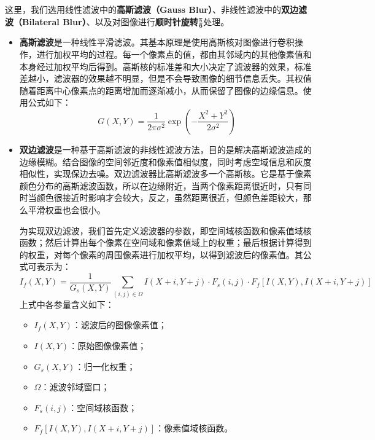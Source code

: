 \documentclass{MathorCupmodeling}
\begin{document}
	这里，我们选用线性滤波中的\textbf{高斯滤波（Gauss Blur）}、非线性滤波中的\textbf{双边滤波（Bilateral Blur）}、以及对图像进行\textbf{顺时针旋转$\boldsymbol{\frac{\pi}{6}}$}处理。
	\begin{itemize}
		\item \textbf{高斯滤波}是一种线性平滑滤波。其基本原理是使用高斯核对图像进行卷积操作，进行加权平均的过程。每一个像素点的值，都由其邻域内的其他像素值和本身经过加权平均后得到。高斯核的标准差和大小决定了滤波器的效果，标准差越小，滤波器的效果越不明显，但是不会导致图像的细节信息丢失。其权值随着距离中心像素点的距离增加而逐渐减小，从而保留了图像的边缘信息。使用公式如下：
		\begin{equation}
			G\left(X,Y\right)=\frac{1}{2\pi\sigma^2}\exp\left(-\frac{X^2+Y^2}{2\sigma^2}\right)
		\end{equation}
		\item \textbf{双边滤波}是一种基于高斯滤波的非线性滤波方法，目的是解决高斯滤波造成的边缘模糊。结合图像的空间邻近度和像素值相似度，同时考虑空域信息和灰度相似性，实现保边去噪。双边滤波器比高斯滤波多一个高斯核。它是基于像素颜色分布的高斯滤波函数，所以在边缘附近，当两个像素距离很近时，只有同时当颜色很接近时影响才会较大，反之，虽然距离很近，但颜色差距较大，那么平滑权重也会很小。
		
		为实现双边滤波，我们首先定义滤波器的参数，即空间域核函数和像素值域核函数；然后计算出每个像素在空间域和像素值域上的权重；最后根据计算得到的权重，对每个像素的周围像素进行加权平均，以得到滤波后的像素值。其公式可表示为：
		\begin{equation}
			I_f\left( X,Y \right) =\frac{1}{G_s\left( X,Y \right)}\sum_{\left( i,j \right) \in \Omega}{I\left( X+i,Y+j \right) \cdot F_s\left( i,j \right)}\cdot F_f\left[ I\left( X,Y \right) ,I\left( X+i,Y+j \right) \right] 
		\end{equation}
		上式中各参量含义如下：
		\begin{itemize}
			\item $I_f\left(X,Y\right)$：滤波后的图像像素值；
			\item $I\left(X,Y\right)$：原始图像像素值；
			\item $G_s\left(X,Y\right)$：归一化权重；
			\item $\Omega$：滤波邻域窗口；
			\item $F_s\left(i,j\right)$：空间域核函数；
			\item $F_f\left[ I\left( X,Y \right) ,I\left( X+i,Y+j \right) \right]$：像素值域核函数。
		\end{itemize}
	\end{itemize}
\end{document}
